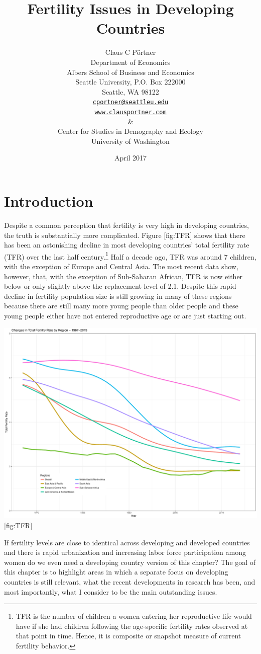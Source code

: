 \documentclass[]{article}
\title{Fertility Issues in Developing Countries}
\author{Claus C Pörtner\\
Department of Economics\\
Albers School of Business and Economics\\
Seattle University, P.O. Box 222000\\
Seattle, WA 98122\\
\href{mailto:cportner@seattleu.edu}{\texttt{cportner@seattleu.edu}}\\
\href{http://www.clausportner.com}{\texttt{www.clausportner.com}}\\
\&\\
Center for Studies in Demography and Ecology\\
University of Washington\\}
\date{April 2017}
\begin{document}
\maketitle

\section{Introduction}\label{introduction}

Despite a common perception that fertility is very high in developing countries, the truth is substantially more complicated. Figure {[}fig:TFR{]} shows that there has been an astonishing decline in most developing countries' total fertility rate (TFR) over the last half century.\footnote{TFR is the number of children a women entering her reproductive life would have if she had children following the age-specific fertility rates observed at that point in time. Hence, it is composite or snapshot measure of current fertility behavior.} Half a decade ago, TFR was around 7 children, with the exception of Europe and Central Asia. The most recent data show, however, that, with the exception of Sub-Saharan African, TFR is now either below or only slightly above the replacement level of 2.1. Despite this rapid decline in fertility population size is still growing in many of these regions because there are still many more young people than older people and these young people either have not entered reproductive age or are just starting out.

\includegraphics{../figures/totalFertilityRates.pdf} {[}fig:TFR{]}

If fertility levels are close to identical across developing and developed countries and there is rapid urbanization and increasing labor force participation among women do we even need a developing country version of this chapter? The goal of this chapter is to highlight areas in which a separate focus on developing countries is still relevant, what the recent developments in research has been, and most importantly, what I consider to be the main outstanding issues.
\end{document}
